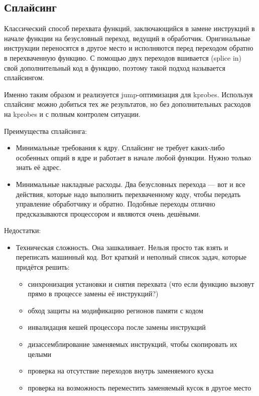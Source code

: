	\subsection{Сплайсинг}
	Классический способ перехвата функций, заключающийся в замене инструкций в начале функции на безусловный переход, ведущий в обработчик. Оригинальные инструкции переносятся в другое место и исполняются перед переходом обратно в перехваченную функцию. С помощью двух переходов вшивается (splice in) свой дополнительный код в функцию, поэтому такой подход называется сплайсингом.

	Именно таким образом и реализуется jump-оптимизация для kprobes. Используя сплайсинг можно добиться тех же результатов, но без дополнительных расходов на kprobes и с полным контролем ситуации.
	
	Преимущества сплайсинга:
	\begin{itemize}
		\item Минимальные требования к ядру. Сплайсинг не требует каких-либо особенных опций в ядре и работает в начале любой функции. Нужно только знать её адрес.
		\item Минимальные накладные расходы. Два безусловных перехода — вот и все действия, которые надо выполнить перехваченному коду, чтобы передать управление обработчику и обратно. Подобные переходы отлично предсказываются процессором и являются очень дешёвыми.
	\end{itemize}
	
	Недостатки:
	\begin{itemize}
		\item Техническая сложность. Она зашкаливает. Нельзя просто так взять и переписать машинный код. Вот краткий и неполный список задач, которые придётся решить:
		\begin{itemize}
			\item синхронизация установки и снятия перехвата (что если функцию вызовут прямо в процессе замены её инструкций?)
			\item обход защиты на модификацию регионов памяти с кодом
			\item инвалидация кешей процессора после замены инструкций
			\item дизассемблирование заменяемых инструкций, чтобы скопировать их целыми
			\item проверка на отсутствие переходов внутрь заменяемого куска
			\item проверка на возможность переместить заменяемый кусок в другое место
		\end{itemize}
	\end{itemize}

